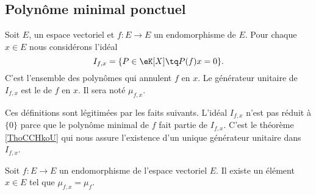 \subsection{Polynôme minimal ponctuel}

\begin{definition}  \label{Decyyumy}
    Soit \( E\), un espace vectoriel et \( f\colon E\to E\) un endomorphisme de \( E\). Pour chaque \( x\in E\) nous considérons l'idéal
    \begin{equation}
        I_{f,x}=\{ P\in \eK[X]\tq P(f)x=0 \}.
    \end{equation}
    C'est l'ensemble des polynômes qui annulent \( f\) en \( x\). Le générateur unitaire de \( I_{f,x}\) est le  de \( f\) en \( x\). Il sera noté \( \mu_{f,x}\).
\end{definition}
Ces définitions sont légitimées par les faits suivants. L'idéal \( I_{f,x}\) n'est pas réduit à \( \{ 0 \}\) parce que le polynôme minimal de \( f\) fait partie de \( I_{f,x}\). C'est le théorème \ref{ThoCCHkoU} qui nous assure l'existence d'un unique générateur unitaire dans~\( I_{f,x}\). 

\begin{lemma}\label{LemSYsJJj}
    Soit \( f\colon E\to E\) un endomorphisme de l'espace vectoriel \( E\). Il existe un élément \( x\in E\) tel que \( \mu_{f,x}=\mu_f\).
\end{lemma}

